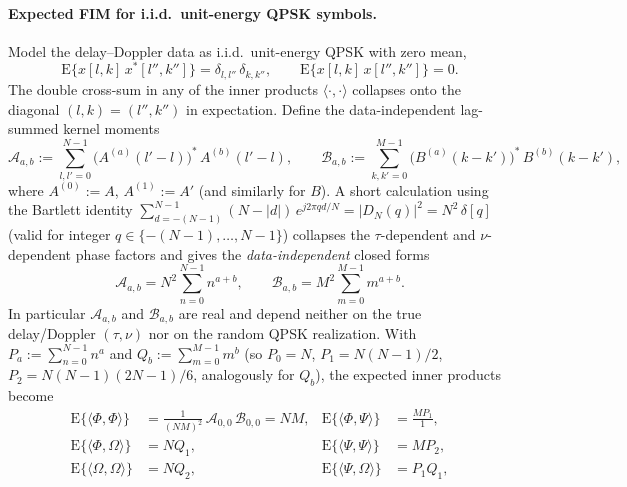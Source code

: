 \documentclass[11pt]{article}
\begin{document}
\paragraph{Expected FIM for i.i.d.\ unit-energy QPSK symbols.} Model the
delay--Doppler data as i.i.d.\ unit-energy QPSK with zero mean,
\begin{equation}
    \mathrm{E}\{x[l,k]\, x^*[l'',k'']\} = \delta_{l,l''}\,\delta_{k,k''},
    \qquad \mathrm{E}\{x[l,k]\, x[l'',k'']\} = 0.
\end{equation}
The double cross-sum in any of the inner products
\(\langle \cdot,\cdot \rangle\) collapses onto the diagonal
\((l,k) = (l'',k'')\) in expectation. Define the data-independent
lag-summed kernel moments
\begin{equation}
    \mathcal{A}_{a,b} := \sum_{l,l'=0}^{N-1}
        \bigl(A^{(a)}(l'-l)\bigr)^*\, A^{(b)}(l'-l), \qquad
    \mathcal{B}_{a,b} := \sum_{k,k'=0}^{M-1}
        \bigl(B^{(a)}(k-k')\bigr)^*\, B^{(b)}(k-k'),
\end{equation}
where \(A^{(0)} := A\), \(A^{(1)} := A'\) (and similarly for \(B\)).
A short calculation using the Bartlett identity
\(\sum_{d=-(N-1)}^{N-1} (N-|d|)\,e^{j2\pi q d/N} = |D_N(q)|^2 = N^2\,\delta[q]\)
(valid for integer \(q \in \{-(N-1),\dots,N-1\}\)) collapses the
\(\tau\)-dependent and \(\nu\)-dependent phase factors and gives the
\emph{data-independent} closed forms
\begin{equation}
    \mathcal{A}_{a,b} = N^2 \sum_{n=0}^{N-1} n^{a+b}, \qquad
    \mathcal{B}_{a,b} = M^2 \sum_{m=0}^{M-1} m^{a+b}.
\label{eq:OTFS_AB_QPSK}
\end{equation}
In particular \(\mathcal{A}_{a,b}\) and \(\mathcal{B}_{a,b}\) are real and
depend neither on the true delay/Doppler \((\tau,\nu)\) nor on the random
QPSK realization. With
\(P_a := \sum_{n=0}^{N-1} n^a\) and \(Q_b := \sum_{m=0}^{M-1} m^b\) (so
\(P_0 = N\), \(P_1 = N(N-1)/2\), \(P_2 = N(N-1)(2N-1)/6\), analogously
for \(Q_b\)), the expected inner products become
\begin{align}
    \mathrm{E}\{\langle \Phi,\Phi\rangle\} &= \tfrac{1}{(NM)^2}\,
        \mathcal{A}_{0,0}\,\mathcal{B}_{0,0} = NM, &
    \mathrm{E}\{\langle \Phi,\Psi\rangle\} &= \tfrac{M P_1}{1}, \\
    \mathrm{E}\{\langle \Phi,\Omega\rangle\} &= N Q_1, &
    \mathrm{E}\{\langle \Psi,\Psi\rangle\} &= M P_2, \\
    \mathrm{E}\{\langle \Omega,\Omega\rangle\} &= N Q_2, &
    \mathrm{E}\{\langle \Psi,\Omega\rangle\} &= P_1 Q_1,
\end{align}
\end{document}

